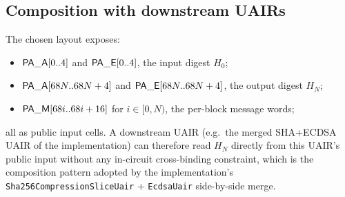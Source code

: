 \subsection{Composition with downstream UAIRs}

The chosen layout exposes:
\begin{itemize}
\item $\mathsf{PA\_A}[0..4]$ and $\mathsf{PA\_E}[0..4]$, the
input digest $H_0$;
\item $\mathsf{PA\_A}[68N..68N+4]$ and $\mathsf{PA\_E}[68N..68N+4]$,
the output digest $H_N$;
\item $\mathsf{PA\_M}[68i..68i+16]$ for $i \in [0,N)$, the per-block
message words;
\end{itemize}
all as public input cells. A downstream UAIR (e.g.\ the merged
SHA+ECDSA UAIR of the implementation) can therefore read $H_N$
directly from this UAIR's public input without any in-circuit
cross-binding constraint, which is the composition pattern adopted by
the implementation's \texttt{Sha256CompressionSliceUair} +
\texttt{EcdsaUair} side-by-side merge.
